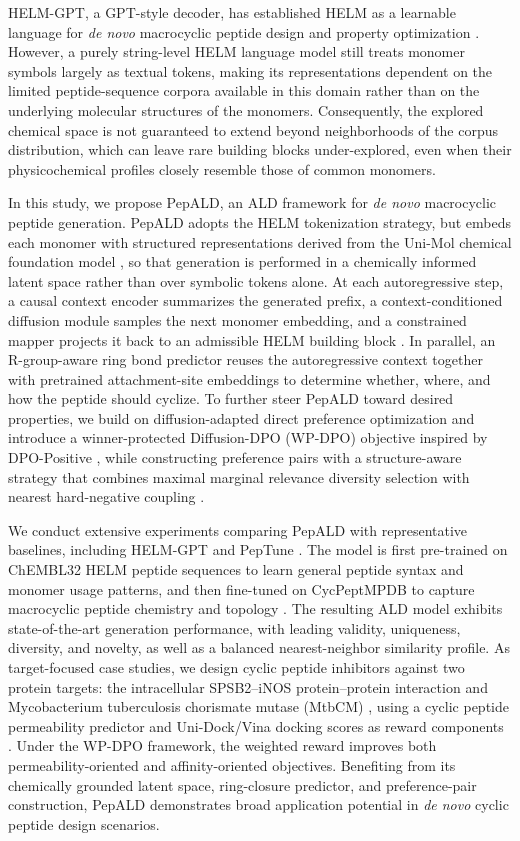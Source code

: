 HELM-GPT, a GPT-style decoder, has established HELM as a learnable language for \textit{de novo} macrocyclic peptide design and property optimization \citep{ref_helm_gpt}. However, a purely string-level HELM language model still treats monomer symbols largely as textual tokens, making its representations dependent on the limited peptide-sequence corpora available in this domain rather than on the underlying molecular structures of the monomers. Consequently, the explored chemical space is not guaranteed to extend beyond neighborhoods of the corpus distribution, which can leave rare building blocks under-explored, even when their physicochemical profiles closely resemble those of common monomers.

In this study, we propose PepALD, an ALD framework for \textit{de novo} macrocyclic peptide generation. PepALD adopts the HELM tokenization strategy, but embeds each monomer with structured representations derived from the Uni-Mol chemical foundation model \citep{ref_unimol}, so that generation is performed in a chemically informed latent space rather than over symbolic tokens alone. At each autoregressive step, a causal context encoder summarizes the generated prefix, a context-conditioned diffusion module samples the next monomer embedding, and a constrained mapper projects it back to an admissible HELM building block \citep{ref_ddpm,ref_ddim}. In parallel, an R-group-aware ring bond predictor reuses the autoregressive context together with pretrained attachment-site embeddings to determine whether, where, and how the peptide should cyclize. To further steer PepALD toward desired properties, we build on diffusion-adapted direct preference optimization \citep{ref_dpo,ref_diffusion_dpo} and introduce a winner-protected Diffusion-DPO (WP-DPO) objective inspired by DPO-Positive \citep{ref_dpop}, while constructing preference pairs with a structure-aware strategy that combines maximal marginal relevance diversity selection with nearest hard-negative coupling \citep{ref_mmr}.

We conduct extensive experiments comparing PepALD with representative baselines, including HELM-GPT and PepTune \citep{ref_helm_gpt,ref_peptune}. The model is first pre-trained on ChEMBL32 HELM peptide sequences to learn general peptide syntax and monomer usage patterns, and then fine-tuned on CycPeptMPDB to capture macrocyclic peptide chemistry and topology \citep{ref_chembl,ref_cycpeptmpdb}. The resulting ALD model exhibits state-of-the-art generation performance, with leading validity, uniqueness, diversity, and novelty, as well as a balanced nearest-neighbor similarity profile. As target-focused case studies, we design cyclic peptide inhibitors against two protein targets: the intracellular SPSB2--iNOS protein--protein interaction \citep{sadek2018cyclic} and Mycobacterium tuberculosis chorismate mutase (MtbCM) \citep{van2025active}, using a cyclic peptide permeability predictor and Uni-Dock/Vina docking scores as reward components \citep{ref_unidock}. Under the WP-DPO framework, the weighted reward improves both permeability-oriented and affinity-oriented objectives. Benefiting from its chemically grounded latent space, ring-closure predictor, and preference-pair construction, PepALD demonstrates broad application potential in \textit{de novo} cyclic peptide design scenarios.
